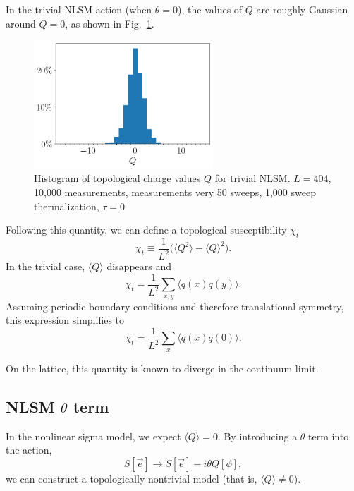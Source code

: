 \documentclass[12pt]{report}
\newcommand{\e}{\vec e}
\begin{document}
In the trivial NLSM action (when $\theta=0$), the values of $Q$ are roughly Gaussian around $Q=0$, as shown in Fig.~\ref{fig:hist}.
\begin{figure}[h]
    \centering
      \includegraphics[width=0.6\textwidth]{imgs/hist.png}
      \caption{\label{fig:hist} Histogram of topological charge values $Q$ for trivial NLSM. $L=404$, 10,000 measurements, measurements very 50 sweeps, 1,000 sweep thermalization, $\tau=0$}
\end{figure}

Following this quantity, we can define a topological susceptibility $\chi_t$
\begin{equation}
\chi_t \equiv \frac{1}{L^2} \Big( \langle Q^2 \rangle - \langle Q \rangle^2 \Big).
\end{equation}
In the trivial case, $\langle Q \rangle$ disappears and   
\begin{equation}
    \chi_t = \frac{1}{L^2} \sum_{x,y} \langle q(x)q(y)\rangle.
\end{equation}
Assuming periodic boundary conditions and therefore translational symmetry, this expression simplifies to 
\begin{equation}
    \chi_t = \frac{1}{L^2} \sum_{x} \langle q(x)q(0)\rangle.
\end{equation}

On the lattice, this quantity is known to diverge in the continuum limit.\cite{bietenholz2018}

\subsection{NLSM $\theta$ term}

In the nonlinear sigma model, we expect $\langle Q \rangle=0$. By introducing a $\theta$ term into the action,
\begin{equation}
    S[\e] \rightarrow S[\e] - i \theta Q[\phi],
\end{equation}
we can construct a topologically nontrivial model (that is, $\langle Q \rangle \neq 0$).
\end{document}
